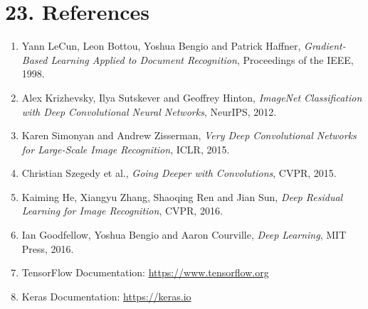\documentclass[11pt]{article}
\begin{document}

\section*{23. References}

\begin{enumerate}

\item Yann LeCun, Leon Bottou, Yoshua Bengio and Patrick Haffner,
\emph{Gradient-Based Learning Applied to Document Recognition},
Proceedings of the IEEE, 1998.

\item Alex Krizhevsky, Ilya Sutskever and Geoffrey Hinton,
\emph{ImageNet Classification with Deep Convolutional Neural Networks},
NeurIPS, 2012.

\item Karen Simonyan and Andrew Zisserman,
\emph{Very Deep Convolutional Networks for Large-Scale Image Recognition},
ICLR, 2015.

\item Christian Szegedy et al.,
\emph{Going Deeper with Convolutions},
CVPR, 2015.

\item Kaiming He, Xiangyu Zhang, Shaoqing Ren and Jian Sun,
\emph{Deep Residual Learning for Image Recognition},
CVPR, 2016.

\item Ian Goodfellow, Yoshua Bengio and Aaron Courville,
\emph{Deep Learning},
MIT Press, 2016.

\item TensorFlow Documentation:
\url{https://www.tensorflow.org}

\item Keras Documentation:
\url{https://keras.io}

\end{enumerate}

\end{document}
